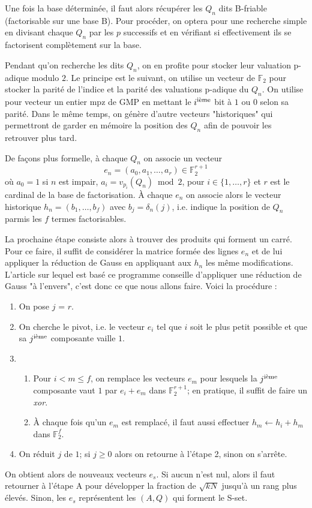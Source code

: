\documentclass[a4paper]{article} %
\numberwithin{equation}{section}
\begin{document}
Une fois la base déterminée, il faut alors récupérer les $Q_n$ dits B-friable (factorisable sur une base B). Pour procéder, on optera pour une recherche simple en divisant chaque $Q_n$ par les $p$ successifs et en vérifiant si effectivement ils se factorisent complètement sur la base.\par
Pendant qu'on recherche les dits $Q_n$, on en profite pour stocker leur valuation p-adique modulo $2$. Le principe est le suivant, on utilise un vecteur de $\mathbb{F}_2$ pour stocker la parité de l'indice et la parité des valuations p-adique du $Q_n$. On utilise pour vecteur un entier mpz de GMP en mettant le $i^{\textup{ième}}$ bit à $1$ ou $0$ selon sa parité. Dans le même temps, on génère d'autre vecteurs "historiques" qui permettront de garder en mémoire la position des $Q_n$ afin de pouvoir les retrouver plus tard.\par
De façons plus formelle, à chaque $Q_n$ on associe un vecteur \[e_n = (a_0,a_1,\dots,a_r)\in\mathbb{F}_2^{r+1}\] où $a_0 = 1$ si $n$ est impair, $a_i = v_{p_i}(Q_n) \bmod 2$, pour $i\in\lbrace1,\dots,r\rbrace$ et $r$ est le cardinal de la base de factorisation. À chaque $e_n$ on associe alors le vecteur historique $h_n = (b_1,\dots,b_f)$ avec $b_j = \delta_n(j)$, i.e. indique la position de $Q_n$ parmis les $f$ termes factorisables.\\\par

La prochaine étape consiste alors à trouver des produits qui forment un carré. Pour ce faire, il suffit de considérer la matrice formée des lignes $e_n$ et de lui appliquer la réduction de Gauss en appliquant aux $h_n$ les même modifications. L'article \cite[Section 2, step B]{AMFF} sur lequel est basé ce programme conseille d'appliquer une réduction de Gauss "à l'envers", c'est donc ce que nous allons faire. Voici la procédure :\\
\begin{enumerate}
\item On pose $j$ = $r$.
\item On cherche le pivot, i.e. le vecteur $e_i$ tel que $i$ soit le plus petit possible et que sa $j^{\textup{ième}}$ composante vaille $1$.
\item{
	\begin{enumerate}
	\item Pour $i< m \leq f$, on remplace les vecteurs $e_m$ pour lesquels la $j^{\textup{ième}}$ composante vaut $1$ par $e_i + e_m$ dans $\mathbb{F}_2^{r+1}$; en pratique, il suffit de faire un \textit{xor}.
	\item À chaque fois qu'un $e_m$ est remplacé, il faut aussi effectuer $h_m \leftarrow h_i + h_m$ dans $\mathbb{F}_2^f$.
	\end{enumerate}}
\item On réduit $j$ de $1$; si $j \geq 0$ alors on retourne à l'étape 2, sinon on s'arrête.\\
\end{enumerate}
On obtient alors de nouveaux vecteurs $e_s$. Si aucun n'est nul, alors il faut retourner à l'étape A pour développer la fraction de $\sqrt{kN}$ jusqu'à un rang plus élevés. Sinon, les $e_s$ représentent les $(A, Q)$ qui forment le S-set.
\end{document}
